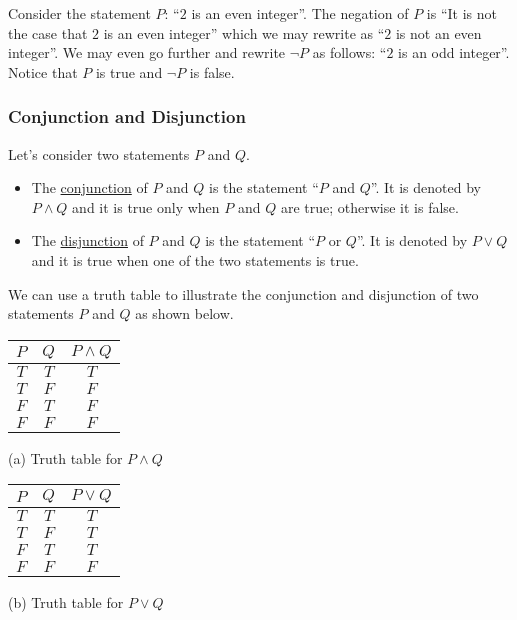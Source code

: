 \begin{example}
Consider the statement $P$: ``$2$ is an even integer''. The negation of $P$ is ``It is not the case that $2$ is an even integer'' which we may rewrite as ``$2$ is not an even integer''. We may even go further and rewrite $\neg P$ as follows: ``$2$ is an odd integer''. Notice that $P$ is true and $\neg P$ is false.
\end{example}

\subsubsection*{Conjunction and Disjunction}
Let's consider two statements $P$ and $Q$.

	\begin{itemize}
		\item The \underline{conjunction} of $P$ and $Q$ is the statement ``$P$ and $Q$''. It is denoted by $P \wedge Q$ and it is true only when $P$ and $Q$ are true; otherwise it is false.
		\item The \underline{disjunction} of $P$ and $Q$ is the statement ``$P$ or $Q$''. It is denoted by $P \vee Q$ and it is true when one of the two statements is true.
	\end{itemize}

We can use a truth table to illustrate the conjunction and disjunction of two statements $P$ and $Q$ as shown below.

\begin{center}
	\begin{minipage}{0.45\textwidth}
	\centering
	\begin{tabular}{c|c|c}
	$P$ & $Q$ & $P \wedge Q$ \\\hline 
	$T$ & $T$ & $T$ \\\hline 
	$T$ & $F$ & $F$ \\\hline 
	$F$ & $T$ & $F$ \\\hline 
	$F$ & $F$ & $F$ \\
	\end{tabular}\vspace*{4pt}

	(a) Truth table for $P \wedge Q$
	\end{minipage}
	\begin{minipage}{0.45\textwidth}
	\centering
	\begin{tabular}{c|c|c}
	$P$ & $Q$ & $P \vee Q$ \\\hline 
	$T$ & $T$ & $T$ \\\hline 
	$T$ & $F$ & $T$ \\\hline 
	$F$ & $T$ & $T$ \\\hline 
	$F$ & $F$ & $F$ \\
	\end{tabular}\vspace*{4pt}

	(b) Truth table for $P \vee Q$
	\end{minipage}
\end{center}


